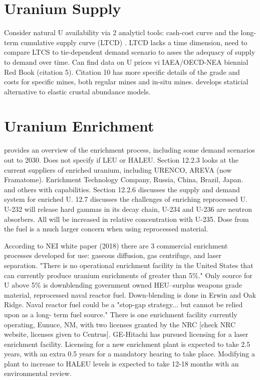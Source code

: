 \documentclass{article}
\begin{document}
\section{Uranium Supply}
Consider natural U availability via 2 analyticl tools: cash-cost 
curve and the long-term cumulative supply curve (LTCD) 
\cite{monnet_statistical_2016}. LTCD lacks a time dimension, need to 
compare LTCS to tie-dependent demand scenario to asses the adequacy 
of supply to demand over time. Can find data on U prices vi 
IAEA/OECD-NEA biennial Red Book (citation 5). Citation 10 has more 
specific details of the grade and costs for specific mines, both 
regular mines and in-situ mines.  \cite{monnet_statistical_2016}
develops staticial alternative to elastic crustal abundance models. 


\section{Uranium Enrichment}
\cite{harding_12_2016} provides an overview of the enrichment process, 
including some demand scenarios out to 2030. Does not specify if 
LEU or HALEU. Section 12.2.3 looks at the current suppliers of enriched 
uranium, including URENCO, AREVA (now Framatome). Enrichment Technology 
Company, Russia, China, Brazil, Japan. and others with capabilities. 
Section 12.2.6 discusses the supply and demand system for enriched U. 
12.7 discusses the challenges of enriching reprocessed U. U-232 will 
release hard gammas in its decay chain, U-234 and U-236 are neutron 
absorbers. All will be increased in relative concentration with U-235. 
Dose from the fuel is a much larger concern when using reprocessed 
material. 

According to NEI white paper (2018) there are 3 commercial enrichment 
processes developed for use: gaseous diffusion, gas centrifuge, and laser 
separation. "There is no operational enrichment facility in the 
United States that can currently produce uranium enrichments of greater
than 5\%." Only source for U above 5\% is downblending government 
owned HEU--surplus weapons grade material, reprocessed naval reactor
fuel. Down-blending is done in Erwin and Oak Ridge. Naval reactor fuel 
could be a "stop-gap strategy... but cannot be relied upon as a long-
term fuel source." There is one enrichment facility currently 
operating, Eunuce, NM, with two licenses granted by the NRC [check 
NRC website, licenses given to Centrus]. GE-Hitachi has pursued 
licensing for a laser enrichment facility. Licensing for a new 
enrichment plant is expected to take 2.5 years, with an extra 0.5 
years for a mandatory hearing to take place. Modifying a plant to 
increase to HALEU levels is expected to take 12-18 months with an 
environmental review. 
\end{document}
